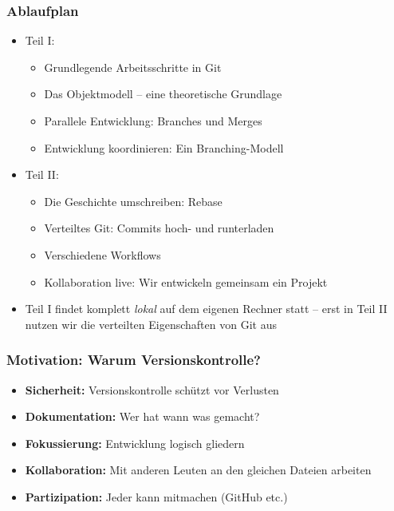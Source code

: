 \documentclass{beamer}
\begin{document}
\begin{frame}
 \frametitle{Ablaufplan}
  


\begin{itemize}
  \item Teil I:
\begin{itemize}
  \item Grundlegende Arbeitsschritte in Git
  \item Das Objektmodell -- eine theoretische Grundlage
  \item Parallele Entwicklung: Branches und Merges
  \item Entwicklung koordinieren: Ein Branching-Modell
\end{itemize}
\end{itemize}

\begin{itemize}
  \item Teil II:
\begin{itemize}
  \item Die Geschichte umschreiben: Rebase
  \item Verteiltes Git: Commits hoch- und runterladen
  \item Verschiedene Workflows
  \item Kollaboration live: Wir entwickeln gemeinsam ein Projekt
\end{itemize}
\end{itemize}

\begin{itemize}
  \item Teil I findet komplett \emph{lokal} auf dem eigenen Rechner statt -- erst in Teil II nutzen wir die verteilten Eigenschaften von Git aus
\end{itemize}

  
 \end{frame}
\begin{frame}
 \frametitle{Motivation: Warum Versionskontrolle?}
  


\begin{itemize}
  \item \textbf{Sicherheit:} Versionskontrolle schützt vor Verlusten
  \item \textbf{Dokumentation:} Wer hat wann was gemacht?
  \item \textbf{Fokussierung:} Entwicklung logisch gliedern
  \item \textbf{Kollaboration:} Mit anderen Leuten an den gleichen Dateien arbeiten
  \item \textbf{Partizipation:} Jeder kann mitmachen (GitHub etc.)
\end{itemize}

  
 \end{frame}
\end{document}
